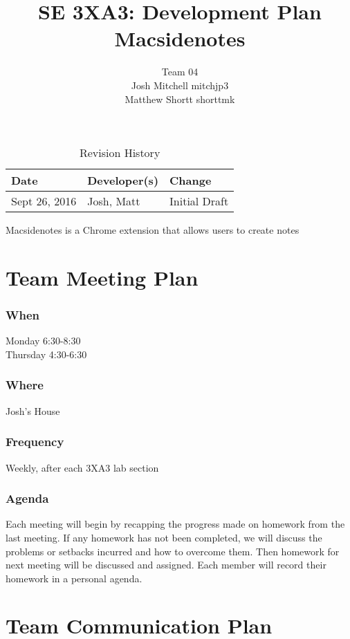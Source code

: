 \documentclass{article}
\title{SE 3XA3: Development Plan\\Macsidenotes}
\author{Team 04
	\\ Josh Mitchell mitchjp3
	\\ Matthew Shortt shorttmk
}
\date{}
\begin{document}
	
	\begin{table}[hp]
		\caption{Revision History} \label{TblRevisionHistory}
		\begin{tabularx}{\textwidth}{llX}
			\toprule
			\textbf{Date} & \textbf{Developer(s)} & \textbf{Change}\\
			\midrule
			Sept 26, 2016 & Josh, Matt & Initial Draft\\
			\bottomrule
		\end{tabularx}
	\end{table}
	
	\newpage
	
	\maketitle
	
	Macsidenotes is a Chrome extension that allows users to create notes
	
	\section{Team Meeting Plan}
	\subsubsection*{When}
	Monday 6:30-8:30 \\
	Thursday 4:30-6:30
	\subsubsection*{Where}
	Josh's House
	\subsubsection*{Frequency}
	Weekly, after each 3XA3 lab section
	\subsubsection*{Agenda}
	Each meeting will begin by recapping the progress made on homework from the 
	last meeting. If any homework has not been completed, we will discuss the 
	problems or setbacks incurred and how to overcome them. Then homework for 
	next meeting will be discussed and assigned. Each member will record their 
	homework in a personal agenda.
	
	\section{Team Communication Plan}
	
\end{document}

